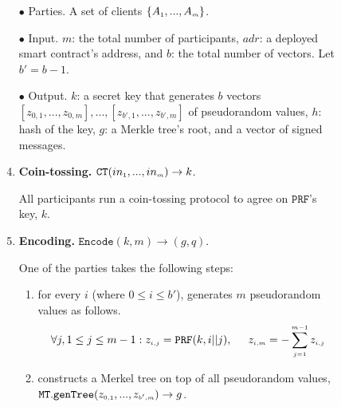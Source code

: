 



\begin{figure}[ht]%
\setlength{\fboxsep}{1pt}
\begin{center}
    \begin{tcolorbox}[enhanced,width=5.5in, 
    drop fuzzy shadow southwest,
    colframe=black,colback=white]


\small{

\begin{enumerate}
\item[$\bullet$]    {Parties.} A set of clients $\{    A_{\scriptscriptstyle 1},...,  A_{\scriptscriptstyle m}\}$.
%
\item[$\bullet$]    {Input.}  $m$: the total number of participants, $adr$: a deployed smart contract's address, and $b$: the total number of vectors. Let $b'=b-1$. 
%
\item[$\bullet$]   {Output.}  $k$: a secret key that generates $b$ vectors $[z_{\scriptscriptstyle 0,1},...,z_{\scriptscriptstyle 0,m}],...,[z_{\scriptscriptstyle b',1},...,z_{\scriptscriptstyle b',m}]$ of pseudorandom values, $h$: hash of the key,  $g$: a Merkle tree's root, and a vector of signed messages. 




\item {\textbf{Coin-tossing.} $\mathtt{CT} (in_{\scriptscriptstyle 1},..., in_{\scriptscriptstyle m})\rightarrow k$}. 

All participants run a coin-tossing protocol to agree on $\mathtt{PRF}$'s key, $k$.
\item\label{ZSPA:val-gen}  {\textbf{Encoding.} $\mathtt{Encode}(k, m)\rightarrow (g,q)$}.

 One of the parties takes the following steps:  
\begin{enumerate}

\item for every $i$ (where $0\leq i \leq b'$), generates $m$ pseudorandom values as follows. 
%
 $$\forall j, 1\leq j \leq m-1: z_{\scriptscriptstyle i,j}=\mathtt{PRF}(k,i||j), \hspace{5mm} z_{\scriptscriptstyle i,m}=-\sum\limits^{\scriptscriptstyle m-1}_{\scriptscriptstyle j=1}z_{\scriptscriptstyle i,j}$$
%
\item   constructs a Merkel tree on top of all pseudorandom values,  $\mathtt{MT.genTree}(z_{\scriptscriptstyle 0,1},...,z_{\scriptscriptstyle b',m})\rightarrow g$. 


\end{enumerate}
\end{enumerate}}
\end{tcolorbox}
\end{center}
\end{figure}
